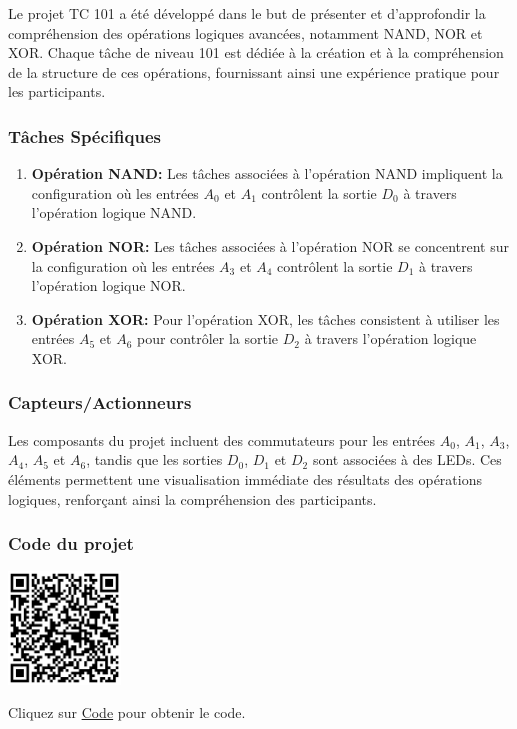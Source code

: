 \documentclass[a4paper,12pt]{report}
\begin{document}
Le projet TC 101 a été développé dans le but de présenter et d'approfondir la compréhension des opérations logiques avancées, notamment NAND, NOR et XOR. Chaque tâche de niveau 101 est dédiée à la création et à la compréhension de la structure de ces opérations, fournissant ainsi une expérience pratique pour les participants.

\subsubsection{Tâches Spécifiques}

\begin{enumerate}
   \item \textbf{Opération NAND:} Les tâches associées à l'opération NAND impliquent la configuration où les entrées \(A_0\) et \(A_1\) contrôlent la sortie \(D_0\) à travers l'opération logique NAND.
    
    \item \textbf{Opération NOR:} Les tâches associées à l'opération NOR se concentrent sur la configuration où les entrées \(A_3\) et \(A_4\) contrôlent la sortie \(D_1\) à travers l'opération logique NOR.
    
    \item \textbf{Opération XOR:} Pour l'opération XOR, les tâches consistent à utiliser les entrées \(A_5\) et \(A_6\) pour contrôler la sortie \(D_2\) à travers l'opération logique XOR. 
\end{enumerate}

\subsubsection{Capteurs/Actionneurs}

Les composants du projet incluent des commutateurs pour les entrées \(A_0\), \(A_1\), \(A_3\), \(A_4\), \(A_5\) et \(A_6\), tandis que les sorties \(D_0\), \(D_1\) et \(D_2\) sont associées à des LEDs. Ces éléments permettent une visualisation immédiate des résultats des opérations logiques, renforçant ainsi la compréhension des participants.

\subsubsection{Code du projet}

\begin{minipage}{0.5\textwidth}
    \includegraphics[height=3cm]{Code TC101.png}
\end{minipage}%
\begin{minipage}{0.5\textwidth}
    Cliquez sur \href{https://github.com/DexterTaha/Controllino-PLC-Sample/blob/main/TC100/TC101_NAND_NOR_XOR/TC101_NAND_NOR_XOR.ino}{Code} pour obtenir le code.
\end{minipage}
\end{document}
